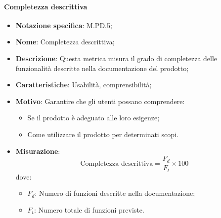 \paragraph*{Completezza descrittiva}
\begin{itemize}
    \item \textbf{Notazione specifica}: M.PD.5;
    \item \textbf{Nome}: Completezza descrittiva;
    \item \textbf{Descrizione}: Questa metrica misura il grado di completezza delle funzionalità descritte nella documentazione del prodotto;
    \item \textbf{Caratteristiche}: Usabilità, comprensibilità;
    \item \textbf{Motivo}: Garantire che gli utenti possano comprendere:
    \begin{itemize}
        \item Se il prodotto è adeguato alle loro esigenze;
        \item Come utilizzare il prodotto per determinati scopi.
    \end{itemize}
    \item \textbf{Misurazione}:
    \[
    \text{Completezza descrittiva} = \frac{F_{d}}{F_{t}} \times 100
    \]
    dove:
    \begin{itemize}
        \item $F_{d}$: Numero di funzioni descritte nella documentazione;
        \item $F_{t}$: Numero totale di funzioni previste.
    \end{itemize}
\end{itemize}

